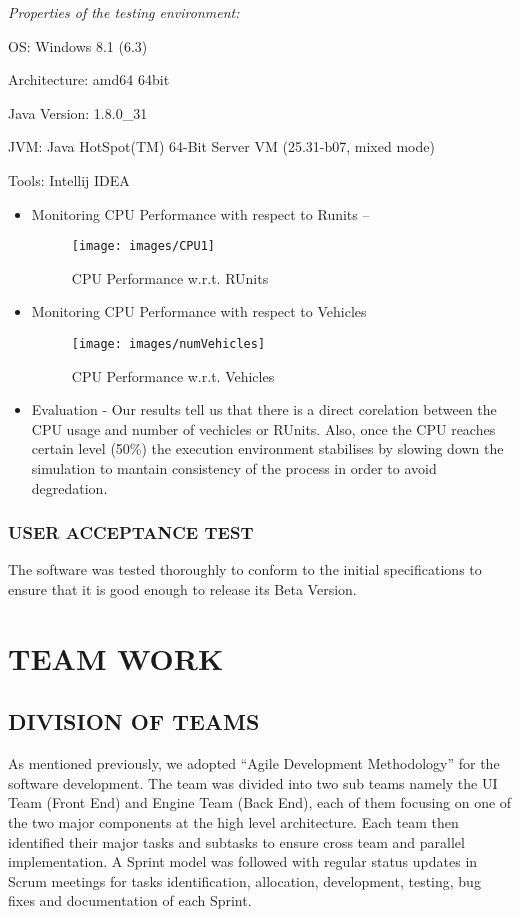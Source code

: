 \documentclass[11pt,a4paper]{article}
\begin{document}
	\setlength{\parindent}{0cm}\bigskip
	\textit{Properties of the testing environment:}
	
	\setlength{\parindent}{1cm}
	OS: Windows 8.1 (6.3)
	
	Architecture: amd64 64bit
	
	Java Version: 1.8.0\_31
	
	JVM: Java HotSpot(TM) 64-Bit Server VM (25.31-b07, mixed mode)
	
	Tools: Intellij IDEA
	
	\begin{itemize}
		\item Monitoring CPU Performance with respect to Runits –
		\begin{figure}[h!]
			\texttt{[image: images/CPU1]}
			\caption{CPU Performance w.r.t. RUnits}
			\centering
		\end{figure} 
		
		\item Monitoring CPU Performance with respect to Vehicles
		
		\begin{figure}[h!]
			\texttt{[image: images/numVehicles]}
			\caption{CPU Performance w.r.t. Vehicles}
			\centering
		\end{figure}
		
		\item Evaluation - Our results tell us that there is a direct corelation between the CPU usage and number of vechicles or RUnits. Also, once the CPU reaches certain level (50\%) the execution environment stabilises by slowing down the simulation to mantain consistency of the process in order to avoid degredation.
	\end{itemize}
	
	\subsubsection{USER ACCEPTANCE TEST}
	The software was tested thoroughly to conform to the initial specifications to ensure that it is good enough to release its Beta Version.

\section{TEAM WORK}
  \subsection{DIVISION OF TEAMS}
  As mentioned previously, we adopted “Agile Development Methodology”
  for the software development. The team was divided into two sub teams
  namely the UI Team (Front End) and Engine Team (Back End), each of
  them focusing on one of the two major components at the high level
  architecture. Each team then identified their major tasks and
  subtasks to ensure cross team and parallel implementation. A Sprint model was followed with regular status updates in Scrum
  meetings for tasks identification, allocation, development, testing,
  bug fixes and documentation of each Sprint.
  
\end{document}
